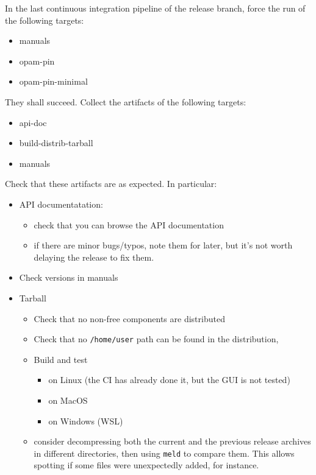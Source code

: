 In the last continuous integration pipeline of the release branch, force the
run of the following targets:
\begin{itemize}
  \item manuals
  \item opam-pin
  \item opam-pin-minimal
\end{itemize}
They shall succeed. Collect the artifacts of the following targets:
\begin{itemize}
  \item api-doc
  \item build-distrib-tarball
  \item manuals
\end{itemize}

Check that these artifacts are as expected. In particular:
\begin{itemize}
  \item API documentatation:
    \begin{itemize}
      \item check that you can browse the API documentation
      \item if there are minor bugs/typos, note them for later, but it's not
        worth delaying the release to fix them.
    \end{itemize}
  \item Check versions in manuals
  \item Tarball
    \begin{itemize}
      \item Check that no non-free components are distributed
      \item Check that no \texttt{/home/user} path can be found in the distribution,
      \item Build and test
        \begin{itemize}
          \item on Linux (the CI has already done it, but the GUI is not tested)
          \item on MacOS 
          \item on Windows (WSL) 
        \end{itemize}
      \item consider decompressing both the current and the previous release
         archives in different directories, then using \texttt{meld} to compare
         them. This allows spotting if some files were unexpectedly added, for
         instance.
    \end{itemize}
\end{itemize}

